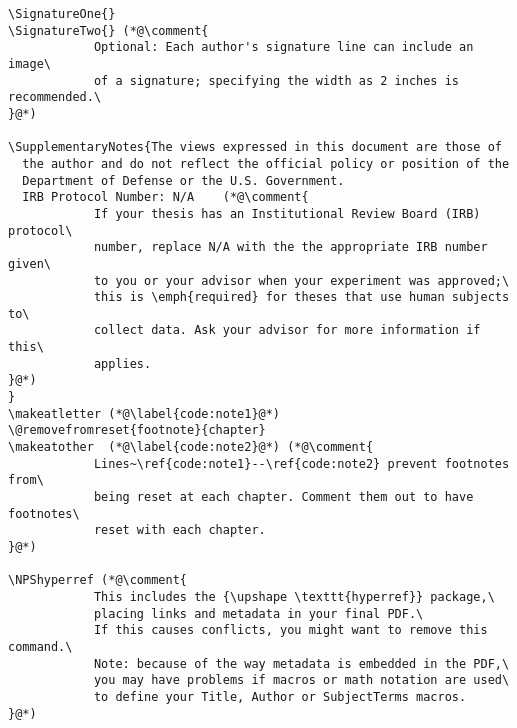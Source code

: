 \begin{lstlisting}
\SignatureOne{}
\SignatureTwo{} (*@\comment{
			Optional: Each author's signature line can include an image\
			of a signature; specifying the width as 2 inches is recommended.\
}@*)

\SupplementaryNotes{The views expressed in this document are those of
  the author and do not reflect the official policy or position of the
  Department of Defense or the U.S. Government.
  IRB Protocol Number: N/A    (*@\comment{
			If your thesis has an Institutional Review Board (IRB) protocol\
			number, replace N/A with the the appropriate IRB number given\
			to you or your advisor when your experiment was approved;\
			this is \emph{required} for theses that use human subjects to\
			collect data. Ask your advisor for more information if this\
			applies.
}@*)
}
\makeatletter (*@\label{code:note1}@*)
\@removefromreset{footnote}{chapter} 
\makeatother  (*@\label{code:note2}@*) (*@\comment{
			Lines~\ref{code:note1}--\ref{code:note2} prevent footnotes from\
			being reset at each chapter. Comment them out to have footnotes\
			reset with each chapter.
}@*)

\NPShyperref (*@\comment{
			This includes the {\upshape \texttt{hyperref}} package,\
			placing links and metadata in your final PDF.\
			If this causes conflicts, you might want to remove this command.\
			Note: because of the way metadata is embedded in the PDF,\
			you may have problems if macros or math notation are used\
			to define your Title, Author or SubjectTerms macros.
}@*)
\end{lstlisting}


